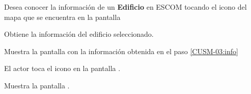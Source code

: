  \begin{UCtrayectoria}
    \UCpaso[\UCactor] Desea conocer la información de un \textbf{Edificio} en ESCOM tocando el icono \botInformacion del mapa que se encuentra en la pantalla 

	\UCpaso[\UCsist] Obtiene la información del edificio seleccionado. \label{CUSM-03:info}

	\UCpaso[\UCsist] Muestra la pantalla  con la información obtenida en el paso \ref{CUSM-03:info}

	\UCpaso[\UCactor] El actor toca el icono \botCerrar en la pantalla .
	
	\UCpaso[\UCsist] Muestra la pantalla  .
	
 \end{UCtrayectoria}

%    
%   
%   
%    
 

 
%
%
 